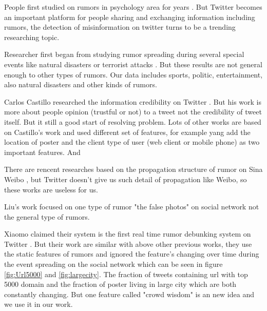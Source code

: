 People first studied on rumors in psychology area for years \cite{allport1947psychology} \cite{sunstein2014rumors}.
But Twitter becomes an important platform for people sharing and exchanging information including rumors, the detection of misinformation on twitter turns to be a trending researching topic. 

Researcher first began from studying rumor spreading during several special events like natural disasters\cite{oh2010exploration} \cite{tanaka2012transmission} or terrorist attacks \cite{starbird2014rumors}. But these results are not general enough to other types of rumors. Our data includes sports, politic, entertainment, also natural disasters and other kinds of rumors. 

Carlos Castillo researched the information credibility on Twitter\cite{mendoza2010twitter} \cite{castillo2011information}\cite{gupta2014tweetcred}. But his work is more about people opinion (trustful or not) to a tweet not the credibility of tweet itself. But it still a good start of resolving problem. Lots of other works are based on Castillo's work \cite{yang2012automatic} \cite{liu2015real} and used different set of features, for example yang \cite{yang2012automatic} add the location of poster and the client type of user (web client or mobile phone) as two important features.
And 



There are rencent researches based on the propagation structure of rumor on Sina Weibo\cite{wu2015false}  \cite{bao2013new}, but Twitter doesn't give us such detail of propagation like Weibo, so these works are useless for us. 

Liu's work \cite{wu2015false} focused on one type of rumor "the false photos" on social network not the general type of rumors.  

Xiaomo claimed their system is the first real time rumor debunking system on Twitter \cite{liu2015real}. But their work are similar with above other previous works, they use the static features of rumors and ignored the feature's changing over time during the event spreading on the social network which can be seen in figure \ref{fig:Url5000} and \ref{fig:largecity}. The fraction of tweets containing url with top 5000 domain and the fraction of poster living in large city which are both constantly changing. But one feature called "crowd wisdom" is an new idea and we use it in our work.

